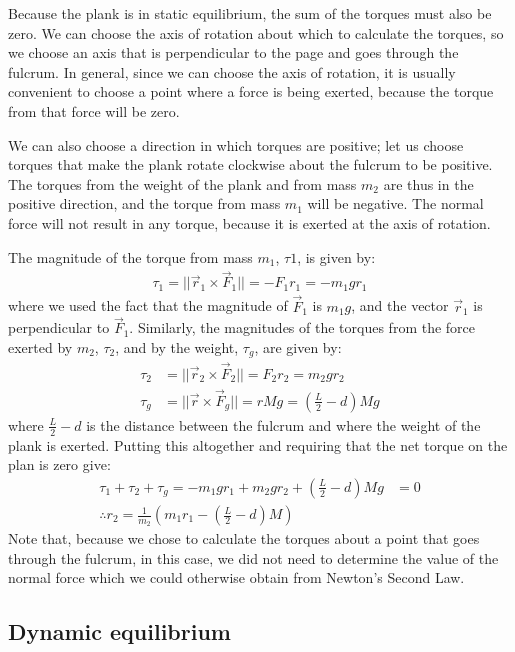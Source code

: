 \begin{example}
Because the plank is in static equilibrium, the sum of the torques must also be zero. We can choose the axis of rotation about which to calculate the torques, so we choose an axis that is perpendicular to the page and goes through the fulcrum. In general, since we can choose the axis of rotation, it is usually convenient to choose a point where a force is being exerted, because the torque from that force will be zero.

We can also choose a direction in which torques are positive; let us choose torques that make the plank rotate clockwise about the fulcrum to be positive. The torques from the weight of the plank and from mass $m_2$ are thus in the positive direction, and the torque from mass $m_1$ will be negative. The normal force will not result in any torque, because it is exerted at the axis of rotation. 

The magnitude of the torque from mass $m_1$, $\tau 1$, is given by:
\begin{align*}
\tau_1 =||\vec r_1 \times \vec F_1||= -F_1 r_1 =-m_1 g r_1
\end{align*}
where we used the fact that the magnitude of $\vec F_1$ is $m_1 g$, and the vector $\vec r_1$ is perpendicular to $\vec F_1$. Similarly, the magnitudes of the torques from the force exerted by $m_2$, $\tau_2$, and by the weight, $\tau_g$, are given by:
\begin{align*}
\tau_2 &=||\vec r_2 \times \vec F_2||= F_2 r_2 =m_2 g r_2\\
\tau_g &= ||\vec r \times \vec F_g||=rMg = \left(\frac{L}{2}-d\right)Mg
\end{align*}
where $\frac{L}{2}-d$ is the distance between the fulcrum and where the weight of the plank is exerted. Putting this altogether and requiring that the net torque on the plan is zero give:
\begin{align*}
\tau_1 + \tau_2 + \tau_g = -m_1 g r_1 +m_2 g r_2 +\left(\frac{L}{2}-d\right)Mg &=0\\
\therefore r_2 = \frac{1}{m_2} \left(m_1r_1-\left(\frac{L}{2}-d\right)M\right)
\end{align*}
Note that, because we chose to calculate the torques about a point that goes through the fulcrum, in this case, we did not need to determine the value of the normal force which we could otherwise obtain from Newton's Second Law.
\end{example}

 

\subsection{Dynamic equilibrium}


